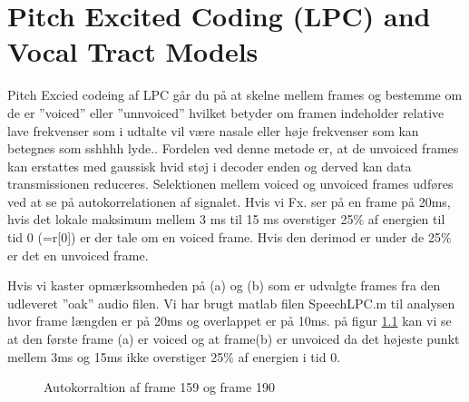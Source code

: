 \chapter{Pitch Excited Coding (LPC) and Vocal Tract Models}
\label{ch:part4}

Pitch Excied codeing af LPC går du på at skelne mellem frames og bestemme om de er ''voiced'' eller ''unnvoiced'' hvilket betyder om framen indeholder relative lave frekvenser som i udtalte vil være nasale eller høje frekvenser som kan betegnes som sshhhh lyde..
Fordelen ved denne metode er, at de unvoiced frames kan erstattes med gaussisk hvid støj i decoder enden og derved kan data transmissionen reduceres. Selektionen mellem voiced og unvoiced frames udføres ved at se på autokorrelationen af signalet. Hvis vi Fx. ser på en frame på 20ms, hvis det lokale maksimum mellem 3 ms til 15 ms overstiger 25$\%$ af energien til tid 0 (=r[0]) er der tale om en voiced frame. Hvis den derimod er under de 25$\%$ er det en unvoiced frame.

  Hvis vi kaster opmærksomheden på (a) og (b) som er udvalgte frames fra den udleveret ''oak'' audio filen. Vi har brugt matlab filen SpeechLPC.m til analysen hvor frame længden er på 20ms og overlappet er på 10ms. på figur \ref{fig:part4_autoko}  
kan vi se at den første frame (a) er voiced og at frame(b) er unvoiced da det højeste punkt mellem 3ms og 15ms ikke overstiger 25$\%$ af energien i tid 0. 

 \begin{figure}[!h]
	\centering
	\caption{ Autokorraltion af frame 159 og frame 190}
	\label{fig:part4_autoko}
\end{figure}

